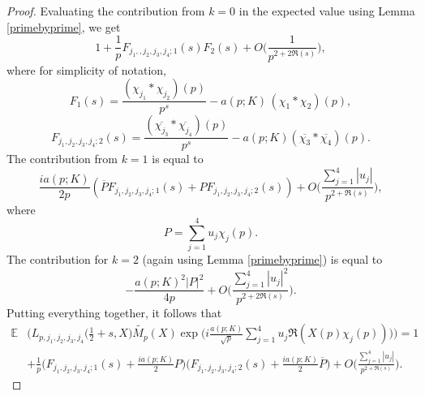 \documentclass[12pt, reqno]{amsart}
\newcommand{\E}{\mathbb{E}}
\numberwithin{equation}{section}
\numberwithin{theorem}{section}
\numberwithin{equation}{section}
\begin{document}
{\begin{proof}
    Evaluating the contribution from $k=0$ in the expected value using Lemma \ref{primebyprime}, we get 
    $$ 1+ \frac{1}{p} F_{j_1,,j_2,j_3,j_4;1}(s) F_2(s)+O \Big( \frac{1}{p^{2+2\Re(s)}}\Big),$$ where for simplicity of notation,
    $$F_1(s)= \frac{(\chi_{j_1}*\chi_{j_2})(p)}{p^{s}} - a(p;K)\,(\chi_1*\chi_2)(p),$$
    $$ F_{j_1,j_2,j_3,j_4;2}(s)=  \frac{(\overline{\chi_{j_3}}*\overline{\chi_{j_4}})(p)}{p^{s}} - a(p;K)(\overline{\chi_3}*\overline{\chi_4})(p).$$
The contribution from $k=1$ is equal to 
$$ \frac{ia(p;K)}{2p} (\overline{P}F_{j_1,j_2,j_3,j_4;1}(s)+P F_{j_1,j_2,j_3,j_4;2}(s))+ O \Big(  \frac{\sum_{j=1}^4 |u_j|}{p^{2+\Re(s)}}\Big),$$ where 
$$ P = \sum_{j=1}^4 u_j \chi_j(p).$$
The contribution for $k=2$ (again using Lemma \ref{primebyprime}) is equal to
$$ - \frac{a(p;K)^2 |P|^2}{4p} + O\Big(  \frac{ \sum_{j=1}^4 |u_j|^2}{p^{2+2\Re(s)}}\Big).$$
 Putting everything together, it follows that 
 \begin{align*}
      \E & \Bigg(L_{p,j_1,j_2,j_3,j_4}\big( \tfrac{1}{2}+s,X) \widetilde{M_p}(X) \exp \Big(  i \frac{a(p;K)}{
    \sqrt{p}}\sum_{j=1}^4   u_j \Re (X(p) \chi_j(p))\Big) \Bigg) = 1 \\
    & + \frac{1}{p} \Big( F_{j_1,j_2,j_3,j_4;1}(s)+\frac{ia(p;K)}{2} P \Big) \Big( F_{j_1,j_2,j_3,j_4;2}(s)+\frac{ia(p;K)}{2} \overline{P} \Big)+O \Big(  \frac{\sum_{j=1}^4 |u_j|}{p^{2+\Re(s)}}\Big).
 \end{align*}
\end{proof}}
\end{document}
